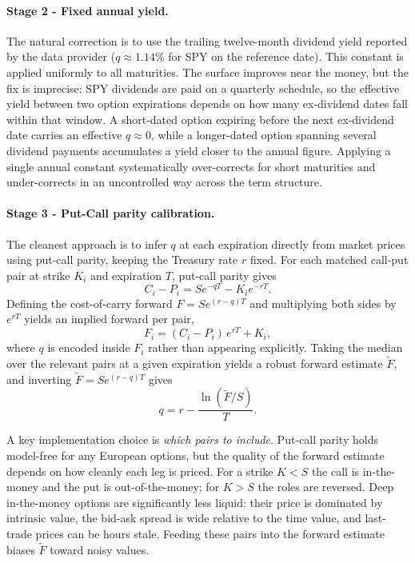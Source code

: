 \paragraph{Stage 2 - Fixed annual yield.}
The natural correction is to use the trailing twelve-month dividend yield reported
by the data provider ($q \approx 1.14\%$ for SPY on the reference date).
This constant is applied uniformly to all maturities.
The surface improves near the money, but the fix is imprecise:
SPY dividends are paid on a quarterly schedule, so the effective yield between
two option expirations depends on how many ex-dividend dates fall within that window.
A short-dated option expiring before the next ex-dividend date carries an effective
$q \approx 0$, while a longer-dated option spanning several dividend payments accumulates
a yield closer to the annual figure.
Applying a single annual constant systematically over-corrects for short maturities
and under-corrects in an uncontrolled way across the term structure.

\paragraph{Stage 3 - Put-Call parity calibration.}
The cleanest approach is to infer $q$ at each expiration directly from market prices
using put-call parity, keeping the Treasury rate $r$ fixed.
For each matched call-put pair at strike $K_i$ and expiration $T$,
put-call parity gives
\begin{equation*}
    C_i - P_i = S e^{-qT} - K_i e^{-rT}.
\end{equation*}
Defining the cost-of-carry forward $F = S e^{(r-q)T}$ and multiplying both sides
by $e^{rT}$ yields an implied forward per pair,
\begin{equation*}
    F_i = (C_i - P_i)\,e^{rT} + K_i,
\end{equation*}
where $q$ is encoded inside $F_i$ rather than appearing explicitly.
Taking the median over the relevant pairs at a given expiration yields a robust
forward estimate $\tilde{F}$, and inverting $\tilde{F} = S e^{(r-q)T}$ gives
\begin{equation*}
    q = r - \frac{\ln(\tilde{F}/S)}{T}.
\end{equation*}

A key implementation choice is \emph{which pairs to include}.
Put-call parity holds model-free for any European options,
but the quality of the forward estimate depends on how cleanly each leg is priced.
For a strike $K < S$ the call is in-the-money and the put is out-of-the-money;
for $K > S$ the roles are reversed.
Deep in-the-money options are significantly less liquid:
their price is dominated by intrinsic value, the bid-ask spread is wide relative
to the time value, and last-trade prices can be hours stale.
Feeding these pairs into the forward estimate biases $\tilde{F}$ toward noisy values.

